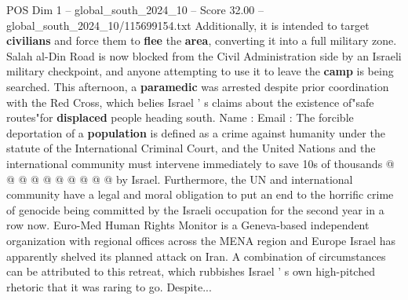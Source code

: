 \begin{textsample}{POS Dim 1 – global\_south\_2024\_10 – Score 32.00 – global\_south\_2024\_10/115699154.txt}
Additionally, it is intended to target \textbf{civilians} and force them to \textbf{flee} the \textbf{area}, converting it into a full military zone.
Salah al-Din Road is now blocked from the Civil Administration side by an Israeli military checkpoint, and anyone attempting to use it to leave the \textbf{camp} is being searched.
This afternoon, a \textbf{paramedic} was arrested despite prior coordination with the Red Cross, which belies Israel ' s claims about the existence of"safe routes"for \textbf{displaced} people heading south.
Name : Email : The forcible deportation of a \textbf{population} is defined as a crime against humanity under the statute of the International Criminal Court, and the United Nations and the international community must intervene immediately to save 10s of thousands @ @ @ @ @ @ @ @ @ @ by Israel.
Furthermore, the UN and international community have a legal and moral obligation to put an end to the horrific crime of genocide being committed by the Israeli occupation for the second year in a row now.
Euro-Med Human Rights Monitor is a Geneva-based independent organization with regional offices across the MENA region and Europe Israel has apparently shelved its planned attack on Iran.
A combination of circumstances can be attributed to this retreat, which rubbishes Israel ' s own high-pitched rhetoric that it was raring to go.
Despite...

\end{textsample}
